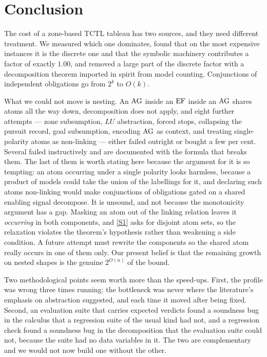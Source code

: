 \section{Conclusion}
\label{sec:conclusion}

The cost of a zone-based TCTL tableau has two sources, and they need different
treatment. We measured which one dominates, found that on the most expensive
instances it is the discrete one and that the symbolic machinery contributes a
factor of exactly $1.00$, and removed a large part of the discrete factor with a
decomposition theorem imported in spirit from model counting. Conjunctions of
independent obligations go from $2^{k}$ to $O(k)$.

What we could not move is nesting. An $\mathrm{AG}$ inside an $\mathrm{EF}$ inside an $\mathrm{AG}$
shares atoms all the way down, decomposition does not apply, and eight further
attempts --- zone subsumption, $LU$ abstraction, forced stops, collapsing the
pursuit record, goal subsumption, encoding $\mathrm{AG}$ as context, and treating
single-polarity atoms as non-linking --- either failed outright or bought a few
per cent. Several failed instructively and are documented with the formula that
breaks them. The last of them is worth stating here because the argument for it
is so tempting: an atom occurring under a single polarity looks harmless,
because a product of models could take the union of the labellings for it, and
declaring such atoms non-linking would make conjunctions of obligations gated on
a shared enabling signal decompose. It is unsound, and not because the
monotonicity argument has a gap. Masking an atom out of the linking relation
leaves it \emph{occurring} in both components, and \ref{S1} asks for disjoint
atom sets, so the relaxation violates the theorem's hypothesis rather than
weakening a side condition. A future attempt must rewrite the components so the
shared atom really occurs in one of them only. Our present belief is that the
remaining growth on nested shapes is the genuine $2^{O(n)}$ of the bound.

Two methodological points seem worth more than the speed-ups. First, the
profile was wrong three times running: the bottleneck was never where the
literature's emphasis on abstraction suggested, and each time it moved after
being fixed. Second, an evaluation suite that carries expected verdicts found a
soundness bug in the calculus that a regression suite of the usual kind had not,
and a regression check found a soundness bug in the decomposition that the
evaluation suite could not, because the suite had no data variables in it. The
two are complementary and we would not now build one without the other.
